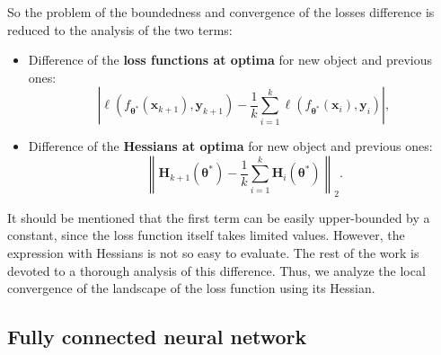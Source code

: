 \documentclass{article}
\begin{document}
So the problem of the boundedness and convergence of the losses difference is reduced to the analysis of the two terms:
\begin{itemize}
    \item Difference of the \textbf{loss functions at optima} for new object and previous ones:
    \[ \left| \ell(f_{\boldsymbol{\theta}^*}(\mathbf{x}_{k+1}), \mathbf{y}_{k+1}) - \dfrac{1}{k} \sum\limits_{i=1}^{k} \ell(f_{\boldsymbol{\theta}^*}(\mathbf{x}_{i}), \mathbf{y}_{i}) \right|, \]
    \item Difference of the \textbf{Hessians at optima} for new object and previous ones:
    \[ \left\| \mathbf{H}_{k+1}(\boldsymbol{\theta}^*) - \dfrac{1}{k} \sum\limits_{i=1}^{k} \mathbf{H}_{i}(\boldsymbol{\theta}^*) \right\|_2. \]
\end{itemize}

It should be mentioned that the first term can be easily upper-bounded by a constant, since the loss function itself takes limited values. However, the expression with Hessians is not so easy to evaluate. The rest of the work is devoted to a thorough analysis of this difference. Thus, we analyze the local convergence of the landscape of the loss function using its Hessian.

\subsection{Fully connected neural network} 
\end{document}
